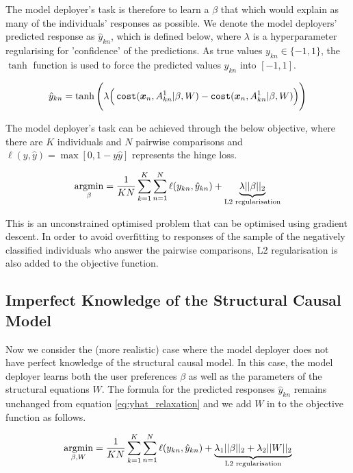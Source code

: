 The model deployer's task is therefore to learn a $\beta$ that which would explain as many of the individuals' responses as possible. We denote the model deployers' predicted response as $\hat{y}_{kn}$, which is defined below, where $\lambda$ is a hyperparameter regularising for 'confidence' of the predictions. As true values $y_{kn} \in \{-1,1\}$, the $\tanh$ function is used to force the predicted values $\hat{y}_{kn}$ into $[-1,1]$.

\begin{equation} \label{eq:yhat_relaxation}
	\hat{y}_{kn} = \tanh \Bigg(\lambda \Big(\operatorname*{\texttt{cost}}(\boldsymbol{x}_n, A^1_{kn}|\beta, W) - \operatorname*{\texttt{cost}}(\boldsymbol{x}_n, A^1_{kn}|\beta, W)\Big)\Bigg)
\end{equation}

The model deployer's task can be achieved through the below objective, where there are $K$ individuals and $N$ pairwise comparisons and $\ell(y, \hat{y}) = \max[0, 1-y\hat{y}]$ represents the hinge loss.

\begin{equation}
	\operatorname*{argmin}_\beta = \frac{1}{KN} \sum_{k=1}^K \sum_{n=1}^N \ell (y_{kn}, \hat{y}_{kn}) + \underbrace{\lambda ||\beta||_2}_{\text{L2 regularisation}}
\end{equation}

This is an unconstrained optimised problem that can be optimised using gradient descent. In order to avoid overfitting to responses of the sample of the negatively classified individuals who answer the pairwise comparisons, L2 regularisation is also added to the objective function.

\subsection{Imperfect Knowledge of the Structural Causal Model}

Now we consider the (more realistic) case where the model deployer does not have perfect knowledge of the structural causal model. In this case, the model deployer learns both the user preferences $\beta$ as well as the parameters of the structural equations $W$. The formula for the predicted responses $\hat{y}_{kn}$ remains unchanged from equation \ref{eq:yhat_relaxation} and we add $W$ in to the objective function as follows.

\begin{equation}
	\operatorname*{argmin}_{\beta, W} = \frac{1}{KN} \sum_{k=1}^K \sum_{n=1}^N \ell (y_{kn}, \hat{y}_{kn}) + \underbrace{\lambda_1 ||\beta||_2 + \lambda_2||W||_2}_{\text{L2 regularisation}}
\end{equation}

